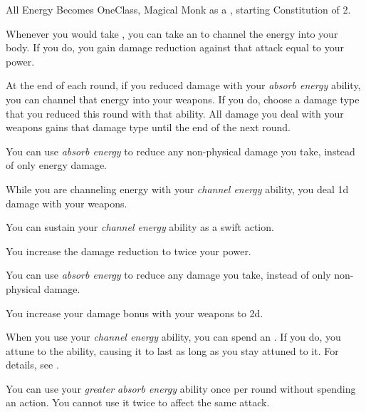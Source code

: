     \begin{feat}{All Energy Becomes One}{Class, Magical}
        \featpre Monk as a , starting Constitution of 2.

         Whenever you would take , you can take an  to channel the energy into your body.
        If you do, you gain damage reduction against that attack equal to your \ki power.

         At the end of each round, if you reduced damage with your \textit{absorb energy} ability, you can channel that energy into your weapons.
        If you do, choose a damage type that you reduced this round with that ability.
        All damage you deal with your weapons gains that damage type until the end of the next round.

         You can use \textit{absorb energy} to reduce any non-physical damage you take, instead of only energy damage.

         While you are channeling energy with your \textit{channel energy} ability, you deal \plus1d damage with your weapons.

         You can sustain your \textit{channel energy} ability as a swift action.

         You increase the damage reduction to twice your \ki power.

         You can use \textit{absorb energy} to reduce any damage you take, instead of only non-physical damage.

         You increase your damage bonus with your weapons to \plus2d.

         When you use your \textit{channel energy} ability, you can spend an .
        If you do, you attune to the ability, causing it to last as long as you stay attuned to it.
        For details, see .

         You can use your \textit{greater absorb energy} ability once per round without spending an action.
        You cannot use it twice to affect the same attack.
    \end{feat}

